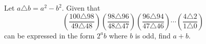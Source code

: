Let $a\triangle b=a^2-b^2$. Given that
\[\left(\dfrac{100\triangle98}{49\triangle48}\right)\left(\dfrac{98\triangle96}{48\triangle47}\right)\left(\dfrac{96\triangle94}{47\triangle46}\right)\cdots\left(\dfrac{4\triangle2}{1\triangle0}\right)\]
can be expressed in the form $2^ab$ where $b$ is odd, find $a+b$.
